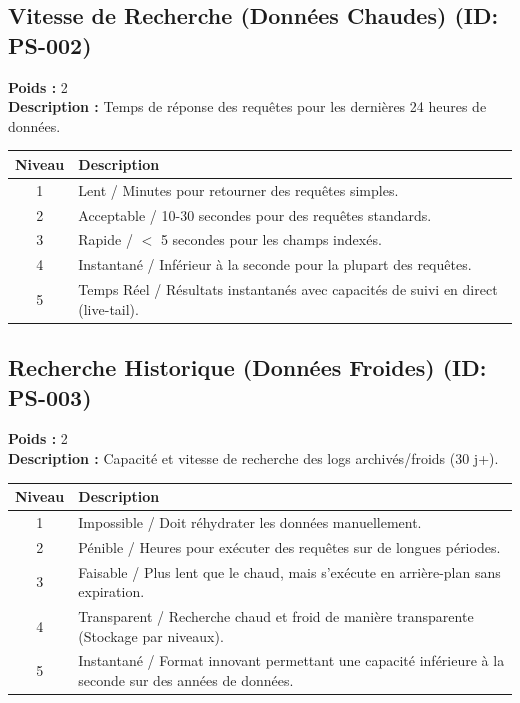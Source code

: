 \documentclass{article}
\begin{document}
\subsection{Vitesse de Recherche (Données Chaudes) (ID: PS-002)}
\textbf{Poids :} 2 \\
\textbf{Description :} Temps de réponse des requêtes pour les dernières 24 heures de données.
\vspace{0.3cm}
\begin{longtable}{|c|p{12cm}|}
\hline
\rowcolor{lightgray} \textbf{Niveau} & \textbf{Description} \\ \hline
1 & Lent / Minutes pour retourner des requêtes simples. \\ \hline
2 & Acceptable / 10-30 secondes pour des requêtes standards. \\ \hline
3 & Rapide / $<$ 5 secondes pour les champs indexés. \\ \hline
4 & Instantané / Inférieur à la seconde pour la plupart des requêtes. \\ \hline
5 & Temps Réel / Résultats instantanés avec capacités de suivi en direct (live-tail). \\ \hline
\end{longtable}
\vspace{0.5cm}
\subsection{Recherche Historique (Données Froides) (ID: PS-003)}
\textbf{Poids :} 2 \\
\textbf{Description :} Capacité et vitesse de recherche des logs archivés/froids (30 j+).
\vspace{0.3cm}
\begin{longtable}{|c|p{12cm}|}
\hline
\rowcolor{lightgray} \textbf{Niveau} & \textbf{Description} \\ \hline
1 & Impossible / Doit réhydrater les données manuellement. \\ \hline
2 & Pénible / Heures pour exécuter des requêtes sur de longues périodes. \\ \hline
3 & Faisable / Plus lent que le chaud, mais s'exécute en arrière-plan sans expiration. \\ \hline
4 & Transparent / Recherche chaud et froid de manière transparente (Stockage par niveaux). \\ \hline
5 & Instantané / Format innovant permettant une capacité inférieure à la seconde sur des années de données. \\ \hline
\end{longtable}
\vspace{0.5cm}
\end{document}
